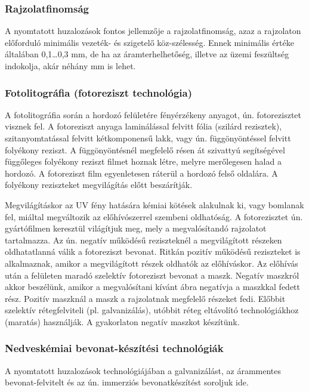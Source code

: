 \documentclass[../labor.tex]{subfiles}
\begin{document}
    \subsubsection{Rajzolatfinomság} A nyomtatott huzalozások fontos jellemzője a rajzolatfinomság, azaz a rajzolaton előforduló minimális vezeték- és szigetelő köz-szélesség. Ennek minimális értéke általában 0,1…0,3 mm, de ha az áramterhelhetőség, illetve az üzemi feszültség indokolja, akár néhány mm is lehet.

    \subsubsection{Fotolitográfia (fotoreziszt technológia)} A fotolitográfia során a hordozó felületére fényérzékeny anyagot, ún. fotorezisztet visznek fel. A fotoreziszt anyaga laminálással felvitt fólia (szilárd rezisztek), szitanyomtatással felvitt kétkomponensű lakk, vagy ún. függönyöntéssel felvitt folyékony reziszt. A függönyöntésnél megfelelő résen át szivattyú segítségével függőleges folyékony reziszt filmet hoznak létre, melyre merőlegesen halad a hordozó. A fotoreziszt film egyenletesen ráterül a hordozó felső oldalára. A folyékony reziszteket megvilágítás előtt beszárítják.

    Megvilágításkor az UV fény hatására kémiai kötések alakulnak ki, vagy bomlanak fel, miáltal megváltozik az előhívószerrel szembeni oldhatóság. A fotorezisztet ún. gyártófilmen keresztül világítjuk meg, mely a megvalósítandó rajzolatot tartalmazza. Az ún. negatív működésű reziszteknél a megvilágított részeken oldhatatlanná válik a fotoreziszt bevonat. Ritkán pozitív működésű reziszteket is alkalmaznak, amikor a megvilágított részek oldhatók az előhíváskor. Az előhívás után a felületen maradó szelektív fotoreziszt bevonat a maszk. Negatív maszkról akkor beszélünk, amikor a megvalósítani kívánt ábra negatívja a maszkkal fedett rész. Pozitív maszknál a maszk a rajzolatnak megfelelő részeket fedi. Előbbit szelektív rétegfelviteli (pl. galvanizálás), utóbbit réteg eltávolító technológiákhoz (maratás) használják. A gyakorlaton negatív maszkot készítünk.
    
    \subsubsection{Nedveskémiai bevonat-készítési technológiák} A nyomtatott huzalozások technológiájában a galvanizálást, az árammentes bevonat-felvitelt és az ún. immerziós bevonatkészítést soroljuk ide.
\end{document}
